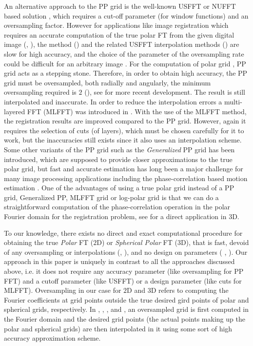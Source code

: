 \documentclass{UCF_ETD}
\begin{document}
 An alternative approach to the PP grid is the well-known USFFT or NUFFT based solution \cite{Markus2007}, which requires a cut-off parameter (for window functions) and  an oversampling factor. However for applications like image registration  which requires an accurate computation of the true polar FT from the given digital image (\cite{Reddy1996}, \cite{Foroosh2002}), the method (\cite{Amir2006}) and the related USFFT  interpolation methods  (\cite{Fessler2003, Markus2007}) are slow for high accuracy, and the choice of the parameter of the
 oversampling rate could be difficult for an arbitrary image \cite{Pan2009}. For the computation of polar grid \cite{Amir2006}, PP grid acts as a stepping stone. Therefore, in order to obtain high accuracy, the PP grid must be oversampled, both radially and angularly, the minimum oversampling required is $2$  (\cite{Amir2006}), see \cite{Nestler2016} for more recent development. The result is still interpolated and inaccurate. In order to reduce the interpolation errors a multi-layered FFT (MLFFT) was introduced in \cite{Pan2009}. With the use of the MLFFT method, the registration results are improved compared to the PP grid. However, again it requires the selection of cuts (of layers), which must be chosen carefully for it to work, but the inaccuracies still exists since it also uses an interpolation scheme. Some other variants of the PP grid such as the \emph{Generalized} PP grid has been introduced, which are supposed to provide closer approximations to the true polar grid,  but fast and accurate estimation has long been a major challenge for many image processing applications including the phase-correlation based motion estimation \cite{Foroosh2002, Chou2009}. One of the advantages of using a true polar grid instead of a PP grid, Generalized PP, MLFFT grid or log-polar grid is that we can do a straightforward computation of the phase-correlation operation in the polar Fourier domain for the registration problem, see \cite{Alam2015} for  a direct application in $3$D.
 
 To our knowledge, there exists no direct and exact computational procedure for obtaining the true \emph{Polar} FT ($2$D) or \emph{Spherical Polar} FT ($3$D), that is fast, devoid of any oversampling or interpolations (\cite{Amir2006}, \cite{Markus2007}), and no design on parameters ( \cite{Markus2007}, \cite{Pan2009}). Our approach in this paper  is uniquely in contrast to all the approaches discussed above, i.e. it does not require any accuracy parameter (like oversampling for PP FFT) and a cutoff parameter (like USFFT) or a design parameter (like cuts for MLFFT). Oversampling in our case for $2$D and $3$D refers to computing the Fourier coefficients at grid points outside the true desired gird points of polar and spherical grids, respectively. In  \cite{Amir2006}, \cite{Markus2007}, \cite{Pan2009}, \cite{Chou2009} and \cite{Potts-etal2001}, an oversampled grid is first computed in the Fourier domain and the desired grid points (the actual points making up the polar and spherical grids) are then interpolated in it using some sort of high accuracy approximation scheme. 
 
\end{document}
